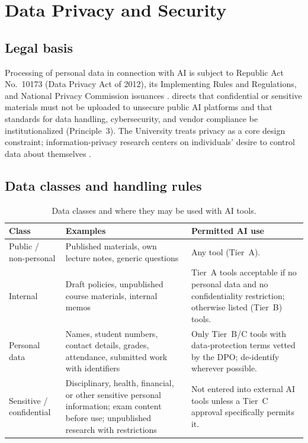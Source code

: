 \section{Data Privacy and Security}\label{sec:privacy}

\subsection{Legal basis}
Processing of personal data in connection with AI is subject to Republic Act No.\ 10173 (Data Privacy Act of 2012), its Implementing Rules and Regulations, and National Privacy Commission issuances \citep{ra10173}. \cmo{} directs that confidential or sensitive materials must not be uploaded to unsecure public AI platforms and that standards for data handling, cybersecurity, and vendor compliance be institutionalized (Principle~3). The University treats privacy as a core design constraint; information-privacy research centers on individuals' desire to control data about themselves \citep{belanger2011}.

\subsection{Data classes and handling rules}
\begin{table}[ht]
\centering
\caption{Data classes and where they may be used with AI tools.}
\small
\begin{tabular}{@{}p{3.4cm}p{4.6cm}p{6cm}@{}}
\toprule
Class & Examples & Permitted AI use \\
\midrule
Public / non-personal & Published materials, own lecture notes, generic questions & Any tool (Tier~A). \\
Internal & Draft policies, unpublished course materials, internal memos & Tier~A tools acceptable if no personal data and no confidentiality restriction; otherwise listed (Tier~B) tools. \\
Personal data & Names, student numbers, contact details, grades, attendance, submitted work with identifiers & Only Tier~B/C tools with data-protection terms vetted by the DPO; de-identify wherever possible. \\
Sensitive / confidential & Disciplinary, health, financial, or other sensitive personal information; exam content before use; unpublished research with restrictions & Not entered into external AI tools unless a Tier~C approval specifically permits it. \\
\bottomrule
\end{tabular}
\end{table}

